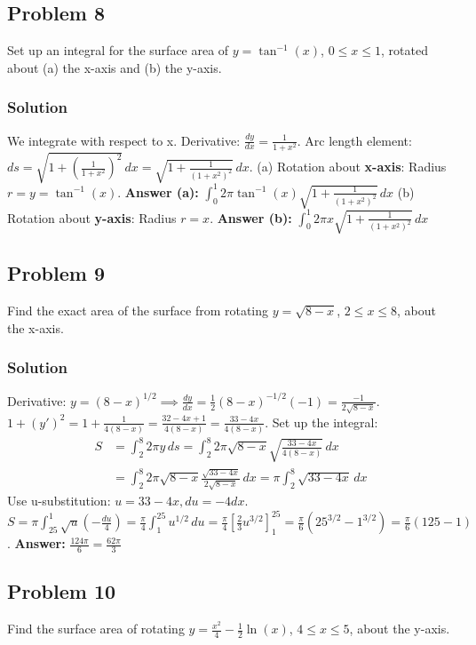 \documentclass{article}
\begin{document}
\subsection{Problem 8}
Set up an integral for the surface area of $y = \tan^{-1}(x)$, $0 \le x \le 1$, rotated about (a) the x-axis and (b) the y-axis.
\subsubsection*{Solution}
We integrate with respect to x.
Derivative: $ \frac{dy}{dx} = \frac{1}{1+x^2} $.
Arc length element: $ ds = \sqrt{1 + \left(\frac{1}{1+x^2}\right)^2} \,dx = \sqrt{1 + \frac{1}{(1+x^2)^2}} \,dx $.
(a) Rotation about \textbf{x-axis}: Radius $r=y=\tan^{-1}(x)$.
\textbf{Answer (a):} $ \int_0^1 2\pi \tan^{-1}(x) \sqrt{1 + \frac{1}{(1+x^2)^2}} \,dx $
(b) Rotation about \textbf{y-axis}: Radius $r=x$.
\textbf{Answer (b):} $ \int_0^1 2\pi x \sqrt{1 + \frac{1}{(1+x^2)^2}} \,dx $

\subsection{Problem 9}
Find the exact area of the surface from rotating $y = \sqrt{8-x}$, $2 \le x \le 8$, about the x-axis.
\subsubsection*{Solution}
Derivative: $y=(8-x)^{1/2} \implies \frac{dy}{dx} = \frac{1}{2}(8-x)^{-1/2}(-1) = \frac{-1}{2\sqrt{8-x}} $.
$1+(y')^2 = 1 + \frac{1}{4(8-x)} = \frac{32-4x+1}{4(8-x)} = \frac{33-4x}{4(8-x)} $.
Set up the integral:
\begin{align*}
    S &= \int_2^8 2\pi y \, ds = \int_2^8 2\pi \sqrt{8-x} \sqrt{\frac{33-4x}{4(8-x)}} \,dx \\
    &= \int_2^8 2\pi \sqrt{8-x} \frac{\sqrt{33-4x}}{2\sqrt{8-x}} \,dx = \pi \int_2^8 \sqrt{33-4x} \,dx
\end{align*}
Use u-substitution: $u=33-4x, du=-4dx$.
$ S = \pi \int_{25}^{1} \sqrt{u} \left(-\frac{du}{4}\right) = \frac{\pi}{4} \int_1^{25} u^{1/2} \,du = \frac{\pi}{4} [\frac{2}{3}u^{3/2}]_1^{25} = \frac{\pi}{6}(25^{3/2} - 1^{3/2}) = \frac{\pi}{6}(125-1) $.
\textbf{Answer:} $ \frac{124\pi}{6} = \frac{62\pi}{3} $

\subsection{Problem 10}
Find the surface area of rotating $y = \frac{x^2}{4} - \frac{1}{2}\ln(x)$, $4 \le x \le 5$, about the y-axis.
\end{document}
